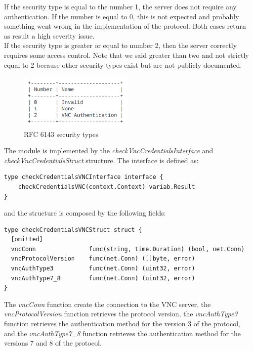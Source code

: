 If the security type is equal to the number 1, the server does not require any authentication. If the number is equal to 0, this is not expected and probably something went wrong in the implementation of the protocol. Both cases return as result a high severity issue. \\
If the security type is greater or equal to number 2, then the server correctly requires some access control. Note that we said greater than two and not strictly equal to 2 because other security types exist but are not publicly documented.

\begin{figure}[h]
  \centering
  \includegraphics[width=0.5\textwidth]{chapters/05/assets/rfc6143-security-types}
  \caption{RFC 6143 security types}
  \label{fig:rfc6143-security-types}
\end{figure}

The module is implemented by the \textit{checkVncCredentialsInterface} and \textit{checkVncCredentialsStruct} structure. The interface is defined as:

\begin{lstlisting}[style=golang]
type checkCredentialsVNCInterface interface {
	checkCredentialsVNC(context.Context) variab.Result
}
\end{lstlisting}

and the structure is composed by the following fields:

\begin{lstlisting}[style=golang]
type checkCredentialsVNCStruct struct {
  [omitted]
  vncConn               func(string, time.Duration) (bool, net.Conn)
  vncProtocolVersion    func(net.Conn) ([]byte, error)
  vncAuthType3          func(net.Conn) (uint32, error)
  vncAuthType7_8        func(net.Conn) (uint32, error)
}
\end{lstlisting}

The \textit{vncConn} function create the connection to the VNC server, the \textit{vncProtocolVersion} function retrieves the protocol version, the \textit{vncAuthType3} function retrieves the authentication method for the version 3 of the protocol, and the \textit{vncAuthType7\_8} function retrieves the authentication method for the versions 7 and 8 of the protocol.

